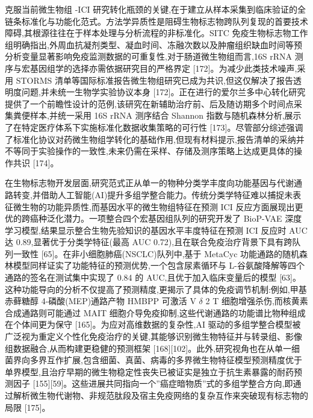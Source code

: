 \documentclass[11pt]{article}
\begin{document}
克服当前微生物组 -ICI 研究转化瓶颈的关键,在于建立从样本采集到临床验证的全链条标准化与功能化范式。方法学异质性是阻碍生物标志物跨队列复现的首要技术障碍,其根源往往在于样本处理与分析流程的非标准化。SITC 免疫生物标志物工作组明确指出,外周血抗凝剂类型、凝血时间、冻融次数以及肿瘤组织缺血时间等预分析变量显著影响免疫监测数据的可重复性,对于肠道微生物组而言,16S rRNA 测序与宏基因组学的选择亦需依据研究目的严格界定 {[}172{]}。为减少此类技术噪声,采用 STORMS 清单等国际标准报告微生物组研究已成为共识,但这仅解决了报告透明度问题,并未统一生物学实验协议本身 {[}172{]}。正在进行的爱尔兰多中心转化研究提供了一个前瞻性设计的范例,该研究在新辅助治疗前、后及随访期多个时间点采集粪便样本,并统一采用 16S rRNA 测序结合 Shannon 指数与随机森林分析,展示了在特定医疗体系下实施标准化数据收集策略的可行性 {[}173{]}。尽管部分综述强调了标准化协议对药微生物组学转化的基础作用,但现有材料提示,报告清单的采纳并不等同于实验操作的一致性,未来仍需在采样、存储及测序策略上达成更具体的操作共识 {[}174{]}。

在生物标志物开发层面,研究范式正从单一的物种分类学丰度向功能基因与代谢通路转变,并借助人工智能(AI)提升多组学整合能力。传统分类学特征难以捕捉未表征微生物的功能异质性,而基因水平的微生物组特征在预测 ICI 反应方面展现出更优的跨癌种泛化潜力。一项整合四个宏基因组队列的研究开发了 BioP-VAE 深度学习模型,结果显示整合生物先验知识的基因水平丰度特征在预测 ICI 反应时 AUC 达 0.89,显著优于分类学特征(最高 AUC 0.72),且在联合免疫治疗背景下具有跨队列一致性 {[}65{]}。在非小细胞肺癌(NSCLC)队列中,基于 MetaCyc 功能通路的随机森林模型同样证实了功能特征的预测优势,一个包含尿素循环与 L-谷氨酸降解等四个通路的签名在测试集中实现了 0.84 的 AUC,且优于加入临床变量后的模型 {[}63{]}。这种功能导向的分析不仅提高了预测精度,更揭示了具体的免疫调节机制:例如,甲基赤藓糖醇 4-磷酸(MEP)通路产物 HMBPP 可激活 V \(\delta\) 2 T 细胞增强杀伤,而核黄素合成通路则可能通过 MAIT 细胞介导免疫抑制,这些代谢通路的功能谱比物种组成在个体间更为保守 {[}165{]}。为应对高维数据的复杂性,AI 驱动的多组学整合模型被广泛视为重定义个性化免疫治疗的关键,其能够识别微生物特征并与转录组、影像组数据融合,从而构建更稳健的预测框架 {[}168{]}{[}102{]}。此外,研究视角也在从单一细菌界向多界互作扩展,包含细菌、真菌、病毒的多界微生物特征模型预测精度优于单界模型,且治疗早期的微生物稳定性丧失已被证实是独立于抗生素暴露的耐药预测因子 {[}155{]}{[}59{]}。这些进展共同指向一个''癌症暗物质''式的多组学整合方向,即通过解析微生物代谢物、非规范肽段及宿主免疫网络的复杂互作来突破现有标志物的局限 {[}175{]}。
\end{document}
